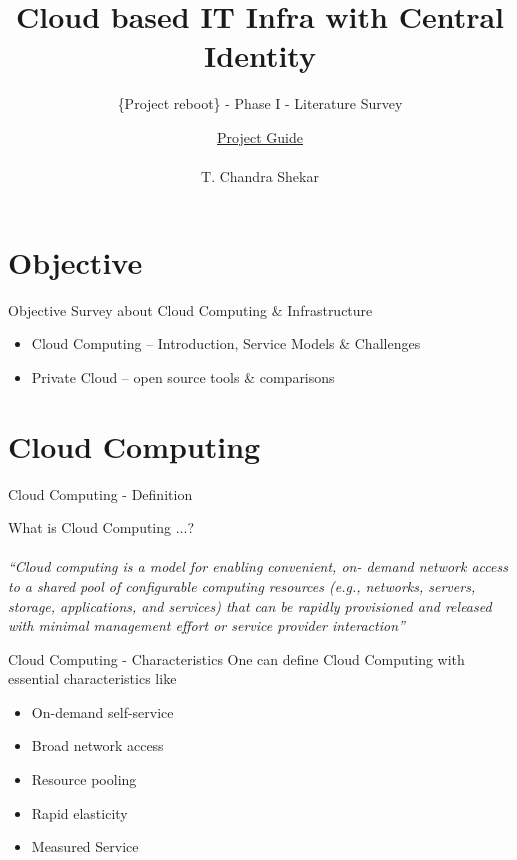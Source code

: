 \documentclass[xcolor=dvipsnames]{beamer}
\title[Cloud based IT Infra with Central Identity]{Cloud based IT Infra with Central Identity}
\subtitle{\{Project reboot\} - Phase I - Literature Survey  }
\author{ \underline{Project Guide} \\ \hspace{2mm} \\ \small{ T. Chandra Shekar }  }
\institute{ \underline{Presenting by} \\ \hspace{2mm} \\ \textit {Aneesh Kumar | N090247 }  \\ \hspace{4mm} \\ \textit{Dept. of CSE, RGUKT - Nuzvid}}
\begin{document}
\begin{frame}
\titlepage
\end{frame}

\section{Objective}
\begin{frame}{Objective}
Survey about Cloud Computing \& Infrastructure 
\begin{itemize}

\item Cloud Computing -- Introduction, Service Models \& Challenges
\item Private Cloud -- open source tools \& comparisons

\end{itemize}
\end{frame}

\section{Cloud Computing}
\begin{frame}{Cloud Computing - Definition }

What is Cloud Computing ...? \\
\hspace{4cm} \\
\textit{``Cloud computing is a model for enabling convenient, on-
demand network access to a shared pool of configurable
computing resources (e.g., networks, servers, storage,
applications, and services) that can be rapidly provisioned
and released with minimal management effort or service
provider interaction''} \cite{ref_1}

\end{frame}

\begin{frame} {Cloud Computing - Characteristics }
One can define Cloud Computing with essential characteristics like

\begin{itemize}
\item On-demand self-service
\item Broad network access
\item Resource pooling
\item Rapid elasticity
\item Measured Service
\end{itemize}
\end{frame}
\end{document}
